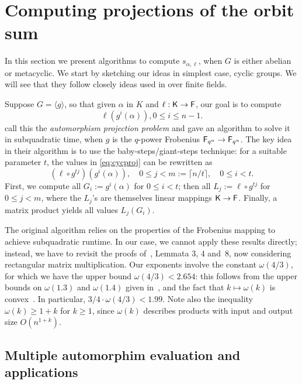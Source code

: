 \section{Computing projections of the orbit sum}
\label{sec:osum}

In this section we present algorithms to compute $s_{\alpha,\ell}$,
when $G$ is either abelian or metacyclic. We start by sketching our
ideas in simplest case, cyclic groups.  We will see that they follow
closely ideas used in \cite{KalSho98} over finite fields.

Suppose $G = \langle g \rangle$, so that given $\alpha$ in $K$ and
$\ell: {\mathsf{K}} \to {\mathsf{F}}$, our goal is to compute
\begin{equation}\label{eq:cycproj}
  \ell(g^i(\alpha)), 0 \leq i \leq n-1.
\end{equation}
 call this the \emph{automorphism projection problem} and
gave an algorithm to solve it in subquadratic time, when $g$ is the
$q$-power Frobenius ${\mathsf{F}}_{q^n} \to {\mathsf{F}}_{q^n}$.  The key idea in their
algorithm is to use the baby-steps/giant-steps technique: for a suitable
parameter $t$, the values in \eqref{eq:cycproj} can be rewritten as
$$(\ell \circ g^{tj})(g^i(\alpha)), \quad 0 \leq j < m:=\lceil n/t
\rceil,\quad 0 \leq i <t.$$ First, we compute all $G_i:=g^i(\alpha)$
for $0 \leq i <t$; then all $L_j:=\ell \circ g^{tj}$ for $0 \leq j
<m$, where the $L_j$'s are themselves linear mappings ${\mathsf{K}} \to {\mathsf{F}}$.
Finally, a matrix product yields all values $L_j(G_i)$.
 
The original algorithm relies on the properties of the Frobenius
mapping to achieve subquadratic runtime. In our case, we cannot apply
these results directly; instead, we have to revisit the proofs
of~, Lemmata 3, 4 and~8, now considering
rectangular matrix multiplication.  Our exponents involve the
constant $\omega(4/3)$, for which we have the upper bound $\omega(4/3)
< 2.654$: this follows from the upper bounds on $\omega(1.3)$ and
$\omega(1.4)$ given in~\cite{LeGall}, and the fact that $k \mapsto
\omega(k)$ is convex~\cite{LoRo83}. In particular, $3/4 \cdot \omega(4/3) <
1.99$. Note also the inequality $\omega(k) \ge 1+k$ for $k\ge 1$,
since $\omega(k)$ describes products with input and output size
$O(n^{1+k})$.


\subsection{Multiple automorphim evaluation and applications}

